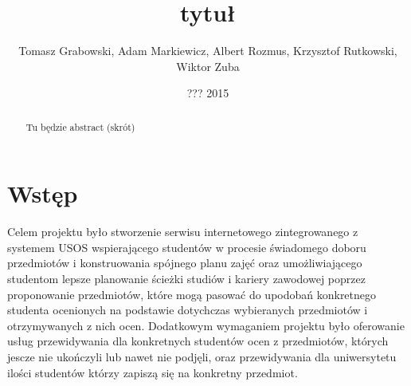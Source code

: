\documentclass[licencjacka]{pracamgr}
\author{Tomasz Grabowski, Adam Markiewicz, Albert Rozmus, Krzysztof Rutkowski, Wiktor Zuba}
\title{tytuł}
\date{??? 2015}
\begin{document}
\maketitle
\begin{abstract}
Tu będzie abstract (skrót)
\end{abstract}
\tableofcontents
\chapter*{Wstęp}

Celem projektu było stworzenie serwisu internetowego zintegrowanego z systemem USOS 
wspierającego studentów w procesie świadomego doboru przedmiotów i konstruowania spójnego planu zajęć oraz
umożliwiającego studentom lepsze planowanie ścieżki studiów i kariery zawodowej
poprzez proponowanie przedmiotów, które mogą pasować do upodobań konkretnego studenta ocenionych na podstawie dotychczas wybieranych przedmiotów i otrzymywanych z nich ocen.
Dodatkowym wymaganiem projektu było oferowanie usług przewidywania dla konkretnych studentów ocen z przedmiotów, których jescze nie ukończyli lub nawet nie podjęli,
oraz przewidywania dla uniwersytetu ilości studentów którzy zapiszą się na konkretny przedmiot.
\end{document}
